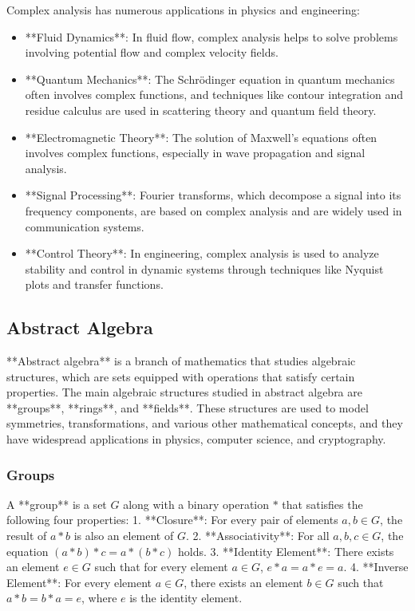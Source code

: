\documentclass{article}
\begin{document}
Complex analysis has numerous applications in physics and engineering:
\begin{itemize}
    \item **Fluid Dynamics**: In fluid flow, complex analysis helps to solve problems involving potential flow and complex velocity fields.
    \item **Quantum Mechanics**: The Schrödinger equation in quantum mechanics often involves complex functions, and techniques like contour integration and residue calculus are used in scattering theory and quantum field theory.
    \item **Electromagnetic Theory**: The solution of Maxwell's equations often involves complex functions, especially in wave propagation and signal analysis.
    \item **Signal Processing**: Fourier transforms, which decompose a signal into its frequency components, are based on complex analysis and are widely used in communication systems.
    \item **Control Theory**: In engineering, complex analysis is used to analyze stability and control in dynamic systems through techniques like Nyquist plots and transfer functions.
\end{itemize}

\subsection{Abstract Algebra}

**Abstract algebra** is a branch of mathematics that studies algebraic structures, which are sets equipped with operations that satisfy certain properties. The main algebraic structures studied in abstract algebra are **groups**, **rings**, and **fields**. These structures are used to model symmetries, transformations, and various other mathematical concepts, and they have widespread applications in physics, computer science, and cryptography.

\subsubsection*{Groups}

A **group** is a set \( G \) along with a binary operation \( * \) that satisfies the following four properties:
1. **Closure**: For every pair of elements \( a, b \in G \), the result of \( a * b \) is also an element of \( G \).
2. **Associativity**: For all \( a, b, c \in G \), the equation \( (a * b) * c = a * (b * c) \) holds.
3. **Identity Element**: There exists an element \( e \in G \) such that for every element \( a \in G \), \( e * a = a * e = a \).
4. **Inverse Element**: For every element \( a \in G \), there exists an element \( b \in G \) such that \( a * b = b * a = e \), where \( e \) is the identity element.
\end{document}
